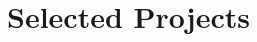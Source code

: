 \documentclass[11pt]{article}
\begin{document}
{\begin{tabularx}{\textwidth}{@{} p{} p{} @{}}
			\end{tabularx}
		}


\vspace{-2em}

\section{\textcolor{section_5}{Selected Projects}}
\vspace{-\baselineskip}
\end{document}
